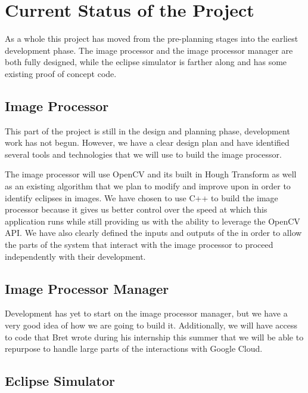 \documentclass[10pt, onecolumn, draftclsnofoot, letterpaper, compsoc]{IEEEtran}
\begin{document}
\section{Current Status of the Project}

As a whole this project has moved from the pre-planning stages into the earliest
development phase. The image processor and the image processor manager are both
fully designed, while the eclipse simulator is farther along and has some existing proof of
concept code.

\subsection{Image Processor}

This part of the project is still in the design and planning phase, development
work has not begun. However, we have a clear design plan and have identified
several tools and technologies that we will use to build the image processor.

The image processor will use OpenCV and its built in Hough Transform as well as
an existing algorithm that we plan to modify and improve upon in order to
identify eclipses in images. We have chosen to use C++ to build the image
processor because it gives us better control over the speed at which this
application runs while still providing us with the ability to leverage the
OpenCV API. We have also clearly defined the inputs and outputs of the in order
to allow the parts of the system that interact with the image processor to
proceed independently with their development.

\subsection{Image Processor Manager}

Development has yet to start on the image processor manager, but we have a very good idea of how we
are going to build it. Additionally, we will have access to code that Bret wrote during his internship
this summer that we will be able to repurpose to handle large parts of the interactions with Google Cloud.

\subsection{Eclipse Simulator}
\end{document}
